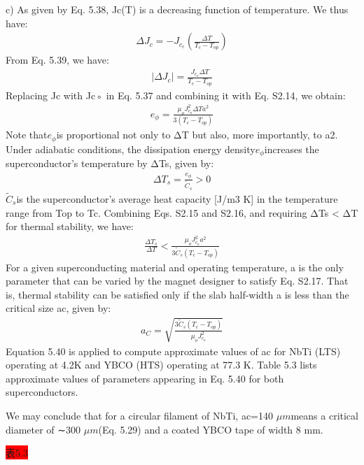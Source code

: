 c) As given by Eq. 5.38, Jc(T) is a decreasing function of temperature. We thus
have:
\begin{align*}%
\Delta J_{c}=-J_{c_{c}}(\frac{\Delta T}{T_{c}-T_{op}})\tag{5.39}
\end{align*}
From Eq. 5.39, we have:
\begin{align*}%
|\Delta J_{c}|=\frac{J_{c_{o}}\Delta T}{T_{c}-T_{op}}\tag{S2.14}
\end{align*}
Replacing Jc with Jc◦ in Eq. 5.37 and combining it with Eq. S2.14, we obtain:
\begin{align*}%
e_{\phi}=\frac{\mu_{o}J_{c_{o}}^{2}\Delta T a^{2}}{3(T_{c}-T_{op})}\tag{S2.15}
\end{align*}
Note that$e_{\phi}$is proportional not only to ΔT but also, more importantly, to a2.
Under adiabatic conditions, the dissipation energy density$e_{\phi}$increases the superconductor’s
temperature by ΔTs, given by:
\begin{align*}%
\Delta T_{s}=\frac{e_{\phi}}{\tilde{C}_{s}}>0\tag{S2.16}
\end{align*}
$\tilde{C}_{s}$is the superconductor’s average heat capacity [J/m3 K] in the temperature
range from Top to Tc. Combining Eqs. S2.15 and S2.16, and requiring ΔTs < ΔT
for thermal stability, we have:
\begin{align*}%
\frac{\Delta T_{s}}{\Delta T}<\frac{\mu_{o}J_{c_{o}}^{2}a^{2}}{3\tilde{C}_{s}(T_{c}-T_{op})}\tag{S2.17}
\end{align*}
For a given superconducting material and operating temperature, a is the only
parameter that can be varied by the magnet designer to satisfy Eq. S2.17. That
is, thermal stability can be satisfied only if the slab half-width a is less than the
critical size ac, given by:
\begin{align*}%
a_{C}=\sqrt{\frac{3\tilde{C}_{s}(T_{c}-T_{op})}{\mu_{o}J_{c_{o}}^{2}}}\tag{5.40}
\end{align*}
Equation 5.40 is applied to compute approximate values of ac for NbTi (LTS) operating
at 4.2K and YBCO (HTS) operating at 77.3 K. Table 5.3 lists approximate
values of parameters appearing in Eq. 5.40 for both superconductors.

We may conclude that for a circular filament of NbTi, ac=140 $\mu m$means a critical
diameter of ∼300 $\mu m$(Eq. 5.29) and a coated YBCO tape of width 8 mm.


\colorbox{red}{表5.3}

